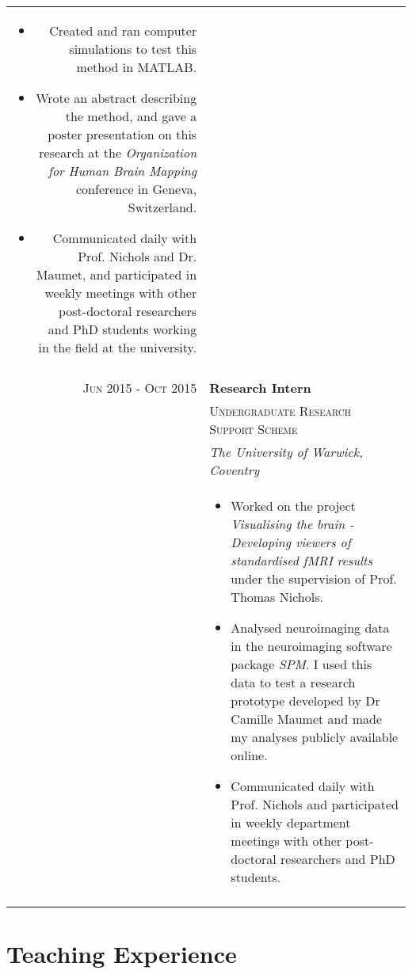 \documentclass[a4paper,10pt]{article}
\begin{document}
\begin{longtable}{rl}
\begin{minipage}[t]{0.8\textwidth}
\begin{itemize}[leftmargin=*]
 \item Created and ran computer simulations to test this method in MATLAB. 
 \item Wrote an abstract describing the method, and gave a poster presentation on this research at the \textit{Organization for Human Brain Mapping} conference in Geneva, Switzerland.  
 \item Communicated daily with Prof. Nichols and Dr. Maumet, and participated in weekly meetings with other post-doctoral researchers and PhD students working in the field at the university. 
  \end{itemize}
 \end{minipage} \\&\\
 
\textsc{Jun} 2015 - \textsc{Oct} 2015
& \large{\textbf{Research Intern}}\\
& \textsc{Undergraduate Research Support Scheme}\\
& \textit{The University of Warwick, Coventry} \\
&\begin{minipage}[t]{0.8\textwidth}
 \begin{itemize}[leftmargin=*]
 \item Worked on the project \textit{Visualising the brain - Developing viewers of standardised fMRI results} under the supervision of Prof. Thomas Nichols.
 \item Analysed neuroimaging data in the neuroimaging software package \textit{SPM}. I used this data to test a research prototype developed by Dr Camille Maumet and made my analyses publicly available online.  
 \item Communicated daily with Prof. Nichols and participated in weekly department meetings with other post-doctoral researchers and PhD students.
\end{itemize}
\end{minipage}\\&\\
\end{longtable}

\section{Teaching Experience}
\end{document}
